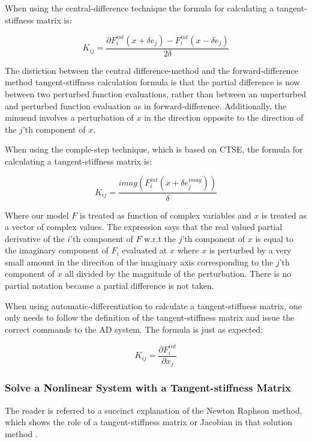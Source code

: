 \documentclass[preprint,12pt]{elsarticle}
\begin{document}
When using the central-difference technique the formula for calculating a tangent-stiffness matrix
is:

\begin{equation} K_{ij} = \frac{\partial F_i^{int}(x + \delta e_j) - F_i^{int}(x - \delta
e_j)}{2\delta} \end{equation}

The distiction between the central difference-method and the forward-difference method
tangent-stiffness calculation formula is that the partial difference is now between two perturbed
function evaluations, rather than between an unperturbed and perturbed function evaluation as in
forward-difference. Additionally, the minuend involves a perturbation of $x$ in the direction opposite to
the direction of the $j$'th component of $x$. 

When using the comple-step technique, which is based on CTSE, the formula for calculating a
tangent-stiffness matrix is:

\begin{equation} K_{ij} = \frac{imag(F_i^{int}(x + \delta e_j^{imag}))}{\delta} \end{equation}

Where our model $F$ is treated as function of complex variables and $x$ is treated as a vector of
complex values. The expression says that the real valued partial derivative of the $i$'th component of $F$
w.r.t the $j$'th component of $x$ is equal to the imaginary component of $F_i$ evaluated at $x$
where $x$ is perturbed by a very small amount in the direciton of the imaginary axis corresponding
to the $j$'th component of $x$ all divided by the magnitude of the perturbation. There is no partial
notation because a partial difference is not taken.

When using automatic-differentiation to calculate a tangent-stiffness matrix, one only needs to
follow the definition of the tangent-stiffness matrix and issue the correct commands to the AD
system. The formula is just as expected:

\begin{equation} K_{ij} = \frac{\partial F_i^{int}}{\partial x_j} \end{equation}

\subsubsection{Solve a Nonlinear System with a Tangent-stiffness Matrix} \label{solve_a_system}
The reader is referred to a succinct explanation of the Newton Raphson method, which shows the
role of a tangent-stiffness matrix or Jacobian in that solution method \cite[chap.
13]{young2009}. 
\end{document}
